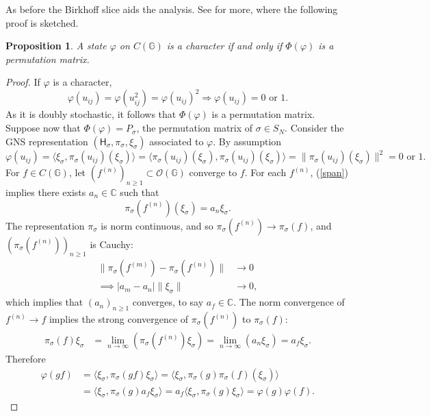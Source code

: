 \documentclass[12pt]{amsart}
\newtheorem{proposition}[theorem]{Proposition}
\theoremstyle{remark}
\theoremstyle{remark}
\begin{document}
\bigskip


  As before the Birkhoff slice aids the analysis. See \cite{mcc} for more, where the following proof is sketched.
\begin{proposition}\label{character}
A state $\varphi$ on $C(\mathbb{G})$ is a character if and only if $\Phi(\varphi)$ is a permutation matrix.
\end{proposition}
\begin{proof}
If $\varphi$ is a character,
$$\varphi(u_{ij})=\varphi(u_{ij}^2)=\varphi(u_{ij})^2\Rightarrow \varphi(u_{ij})=0\text{ or 1}.$$
As it is doubly stochastic, it follows that $\Phi(\varphi)$ is a permutation matrix. Suppose now that $\Phi(\varphi)=P_\sigma$, the permutation matrix of $\sigma\in S_N$. Consider the GNS representation $(\mathsf{H}_{\sigma},\pi_{\sigma},\xi_{\sigma})$ associated to $\varphi$. By assumption
\begin{equation}\varphi(u_{ij})=\langle \xi_{\sigma},\pi_{\sigma}(u_{ij})(\xi_{\sigma})\rangle=\langle \pi_{\sigma}(u_{ij})(\xi_{\sigma}),\pi_{\sigma}(u_{ij})(\xi_{\sigma})\rangle=\|\pi_{\sigma}(u_{ij})(\xi_\sigma)\|^2= 0 \text{ or }1.\label{span}\end{equation}
For $f\in C(\mathbb{G})$, let $(f^{(n)})_{n\geq 1}\subset \mathcal{O}(\mathbb{G})$ converge to $f$. For each $f^{(n)}$, (\ref{span}) implies there exists $a_n\in \mathbb{C}$ such that
$$\pi_\sigma(f^{(n)})(\xi_\sigma)=a_n\xi_\sigma.$$
The representation $\pi_\sigma$ is norm continuous, and so $\pi_\sigma(f^{(n)})\to \pi_\sigma(f)$, and $(\pi_\sigma(f^{(n)}))_{n\geq 1}$ is Cauchy:
\begin{align*}\|\pi_\sigma(f^{(m)})-\pi_\sigma(f^{(n)})\|&\to 0
\\ \implies |a_m-a_n|\|\xi_\sigma\|&\to 0,
\end{align*}
which implies that $(a_n)_{n\geq 1}$ converges, to say $a_f\in\mathbb{C}$. The norm convergence of $f^{(n)}\to f$ implies the strong convergence of $\pi_\sigma(f^{(n)})$ to $\pi_\sigma(f)$:
\begin{align*}
  \pi_\sigma(f)\xi_\sigma & =\lim_{n\rightarrow \infty}\left(\pi_\sigma(f^{(n)})\xi_\sigma\right)  =\lim_{n\rightarrow \infty}(a_n\xi_\sigma)=a_f\xi_\sigma.
\end{align*}
Therefore
\begin{align*}
  \varphi(gf) & =\langle\xi_{\sigma},\pi_{\sigma}(gf)\xi_{\sigma}\rangle=\langle \xi_{\sigma},\pi_{\sigma}(g)\pi_{\sigma}(f)(\xi_{\sigma})\rangle
   \\&=\langle \xi_{\sigma},\pi_{\sigma}(g)a_f \xi_{\sigma}\rangle=a_f\langle\xi_{\sigma},\pi_{\sigma}(g)\xi_{\sigma}\rangle=\varphi(g)\varphi(f).
   \end{align*}
\end{proof}
\end{document}
